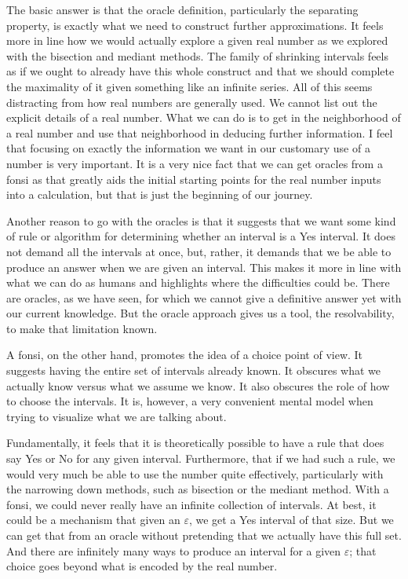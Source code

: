 \documentclass[12pt]{article}
\theoremstyle{remark}
\begin{document}
The basic answer is that the oracle definition, particularly the separating property, is exactly what we need to construct further approximations. It feels more in line how we would actually explore a given real number as we explored with the bisection and mediant methods. The family of shrinking intervals feels as if we ought to already have this whole construct and that we should complete the maximality of it given something like an infinite series. All of this seems distracting from how real numbers are generally used. We cannot list out the explicit details of a real number. What we can do is to get in the neighborhood of a real number and use that neighborhood in deducing further information. I feel that focusing on exactly the information we want in our customary use of a number is very important. It is a very nice fact that we can get oracles from a fonsi as that greatly aids the initial starting points for the real number inputs into a calculation, but that is just the beginning of our journey. 

Another reason to go with the oracles is that it suggests that we want some kind of rule or algorithm for determining whether an interval is a Yes interval. It does not demand all the intervals at once, but, rather, it demands that we be able to produce an answer when we are given an interval. This makes it more in line with what we can do as humans and highlights where the difficulties could be. There are oracles, as we have seen, for which we cannot give a definitive answer yet with our current knowledge. But the oracle approach gives us a tool, the resolvability, to make that limitation known. 

A fonsi, on the other hand, promotes the idea of a choice point of view. It suggests having the entire set of intervals already known. It obscures what we actually know versus what we assume we know. It also obscures the role of how to choose the intervals. It is, however, a very convenient mental model when trying to visualize what we are talking about. 

Fundamentally, it feels that it is theoretically possible to have a rule that does say Yes or No for any given interval. Furthermore, that if we had such a rule, we would very much be able to use the number quite effectively, particularly with the narrowing down methods, such as bisection or the mediant method. With a fonsi, we could never really have an infinite collection of intervals. At best, it could be a mechanism that given an $\varepsilon$, we get a Yes interval of that size. But we can get that from an oracle without pretending that we actually have this full set. And there are infinitely many ways to produce an interval for a given $\varepsilon$; that choice goes beyond what is encoded by the real number. 
\end{document}
